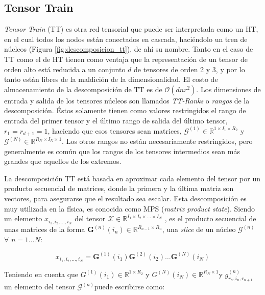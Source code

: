 \documentclass[spanish]{article}
\theoremstyle{definition}
\theoremstyle{remark}
\numberwithin{equation}{section}
\numberwithin{equation}{section} %
\begin{document}
\subsection{Tensor Train}
\textit{Tensor Train} (TT) \cite{oseledets2011tensor} es otra red tensorial que puede ser interpretada como un HT, en el cual todos los nodos están conectados en cascada, haciéndolo un tren de núcleos (Figura \ref{fig:descomposicion_tt}), de ahí su nombre. Tanto en el caso de TT como el de HT tienen como ventaja que la representación de un tensor de orden alto está reducida a un conjunto $d$ de tensores de orden 2 y 3, y por lo tanto están libres de la maldición de la dimensionalidad. El costo de almacenamiento de la descomposición de TT es de $\mathcal{O}(dnr^2)$. Los dimensiones de entrada y salida de los tensores núcleos son llamados  \textit{TT-Ranks} o \textit{rangos} de la descomposición. Éstos solamente tienen como valores restringidos el rango de entrada del primer tensor y el último rango de salida del último tensor, $r_1=r_{d+1}=1$, haciendo que esos tensores sean matrices, $\mathcal{G}^{(1)} \in \mathbb{R} ^{1 \times I_1 \times R_2 }$ y $\mathcal{G}^{(N)} \in \mathbb{R} ^{R_N \times I_N \times 1}$. Los otros rangos no están necesariamente restringidos, pero generalmente es común que los rangos de los tensores intermedios sean más grandes que aquellos de los extremos.  
\par
La descomposición TT está basada en aproximar cada elemento del tensor por un producto secuencial de matrices, donde la primera y la última matriz son vectores, para asegurarse que el resultado sea escalar. Esta descomposición es muy utilizada en la física, es conocida como MPS (\textit{matrix product state}). Siendo un elemento $x_{i_1,i_2, \ldots ,i_N}$ del tensor $\mathcal{X} \in \mathbb{R}^{I_1 \times I_2 \times  \ldots \times I_N}$ , es el producto secuencial de unas matrices de la forma $\boldsymbol{G}^{(n)}(i_n)\in \mathbb{R} ^{R_{n-1} \times R_n } $,  una \textit{slice} de un núcleo $\mathcal{G}^{(n)}$ $\forall$ $n=1 \ldots N$: 
\par
\begin{equation}
\label{slice_representation_TT}
x_{i_1,i_2, \ldots ,i_N}= \boldsymbol{G}^{(1)}(i_1) \boldsymbol{G}^{(2)}(i_2) \ldots \boldsymbol{G}^{(N)}(i_N)  
\end{equation} \par
Teniendo en cuenta que ${G}^{(1)}(i_1)\in \mathbb{R} ^{1 \times R_2 }$ y ${G}^{(N)}(i_N)\in \mathbb{R} ^{R_N \times 1 }$y $g_{r_n,i_n,r_{n+1}}^{(n)}$ un elemento del tensor $\mathcal{G}^{(n)}$puede escribirse como: \par
\end{document}
